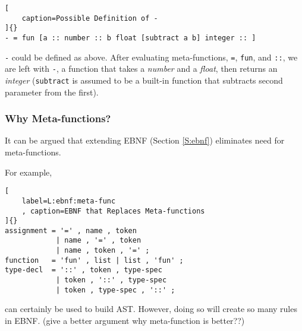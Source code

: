 \documentclass[12pt,letterpaper,notitlepage]{article}
\begin{document}
\begin{lstlisting}[
    caption=Possible Definition of -
]{}
- = fun [a :: number :: b float [subtract a b] integer :: ]
\end{lstlisting}
\verb!-! could be defined as above.
After evaluating meta-functions, \verb!=!, \verb!fun!, and \verb!::!,
we are left with \verb!-!, a function that takes a \emph{number}
and a \emph{float},
then returns an \emph{integer} (\verb!subtract! is assumed to be
a built-in function that subtracts second parameter from the first).

\subsubsection{Why Meta-functions?}
\label{S:why-meta-func}

It can be argued that extending EBNF (Section \ref{S:ebnf})
eliminates need for meta-functions.

For example,

\begin{lstlisting}[
    label=L:ebnf:meta-func
    , caption=EBNF that Replaces Meta-functions
]{}
assignment = '=' , name , token
            | name , '=' , token
            | name , token , '=' ;
function   = 'fun' , list | list , 'fun' ;
type-decl  = '::' , token , type-spec
            | token , '::' , type-spec
            | token , type-spec , '::' ;
\end{lstlisting}

can certainly be used to build AST.
However, doing so will create so many rules in EBNF.
(give a better argument why meta-function is better??)
\end{document}
